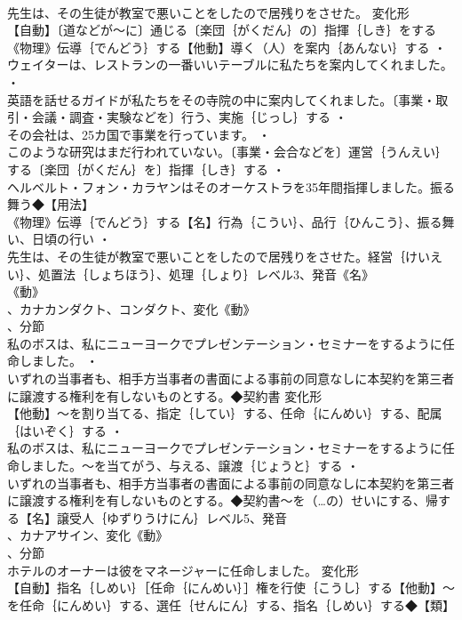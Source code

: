 \documentclass[8pt]{extreport}
\begin{document}
\begin{CJK}{UTF8}{min}
\\	先生は、その生徒が教室で悪いことをしたので居残りをさせた。	変化形 
\\	【自動】〔道などが～に〕通じる〔楽団｛がくだん｝の〕指揮｛しき｝をする《物理》伝導｛でんどう｝する【他動】導く（人）を案内｛あんない｝する ・
\\	ウェイターは、レストランの一番いいテーブルに私たちを案内してくれました。 ・
\\	英語を話せるガイドが私たちをその寺院の中に案内してくれました。〔事業・取引・会議・調査・実験などを〕行う、実施｛じっし｝する ・
\\	その会社は、25カ国で事業を行っています。 ・
\\	このような研究はまだ行われていない。〔事業・会合などを〕運営｛うんえい｝する〔楽団｛がくだん｝を〕指揮｛しき｝する ・
\\	ヘルベルト・フォン・カラヤンはそのオーケストラを35年間指揮しました。振る舞う◆【用法】
\\	《物理》伝導｛でんどう｝する【名】行為｛こうい｝、品行｛ひんこう｝、振る舞い、日頃の行い ・
\\	先生は、その生徒が教室で悪いことをしたので居残りをさせた。経営｛けいえい｝、処置法｛しょちほう｝、処理｛しょり｝レベル3、発音《名》
\\	《動》
\\	、カナカンダクト、コンダクト、変化《動》
\\	、分節
\\	私のボスは、私にニューヨークでプレゼンテーション・セミナーをするように任命しました。 ・
\\	いずれの当事者も、相手方当事者の書面による事前の同意なしに本契約を第三者に譲渡する権利を有しないものとする。◆契約書	変化形 
\\	【他動】～を割り当てる、指定｛してい｝する、任命｛にんめい｝する、配属｛はいぞく｝する ・
\\	私のボスは、私にニューヨークでプレゼンテーション・セミナーをするように任命しました。～を当てがう、与える、譲渡｛じょうと｝する ・
\\	いずれの当事者も、相手方当事者の書面による事前の同意なしに本契約を第三者に譲渡する権利を有しないものとする。◆契約書～を（…の）せいにする、帰する【名】譲受人｛ゆずりうけにん｝レベル5、発音
\\	、カナアサイン、変化《動》
\\	、分節
\\	ホテルのオーナーは彼をマネージャーに任命しました。	変化形 
\\	【自動】指名｛しめい｝［任命｛にんめい｝］権を行使｛こうし｝する【他動】～を任命｛にんめい｝する、選任｛せんにん｝する、指名｛しめい｝する◆【類】

\end{CJK}
\end{document}
